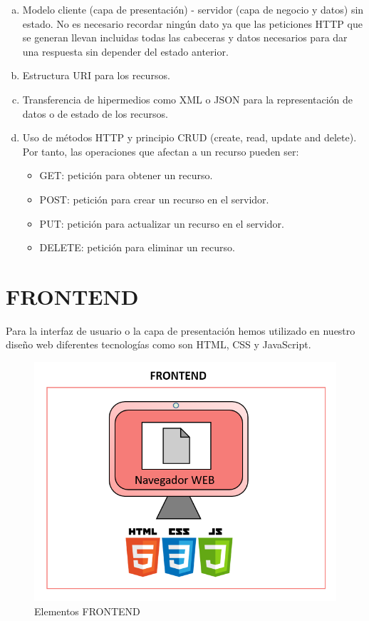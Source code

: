 \documentclass[a4paper, 12pt]{book}
\begin{document}
\begin{enumerate}[a)] %
\item Modelo cliente (capa de presentación) - servidor (capa de negocio y datos) sin estado. No es necesario recordar ningún dato ya que las peticiones HTTP que se generan llevan incluidas todas las cabeceras y datos necesarios para dar una respuesta sin depender del estado anterior.
\item Estructura URI para los recursos.
\item Transferencia de hipermedios como XML o JSON para la representación de datos o de estado de los recursos.
\item Uso de métodos HTTP y principio CRUD (create, read, update and delete). Por tanto, las operaciones que afectan a un recurso pueden ser:
\begin{itemize}
    \item GET: petición para obtener un recurso.
    \item POST: petición para crear un recurso en el servidor.
    \item PUT: petición para actualizar un recurso en el servidor.
    \item DELETE: petición para eliminar un recurso.~\cite{rodriguez2008restful}
\end{itemize}
\end{enumerate}
\section{FRONTEND}
Para la interfaz de usuario o la capa de presentación hemos utilizado en nuestro diseño web diferentes tecnologías como son HTML, CSS y JavaScript.
\begin{figure}[h]
        \centering
        \includegraphics[scale=0.4]{img/frontend.png}
        \caption{Elementos FRONTEND}
        \label{figura:frontend}
\end{figure}
\end{document}
